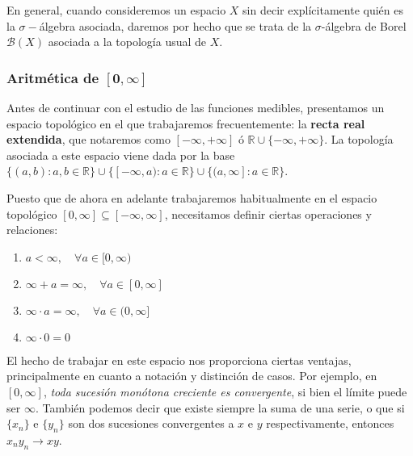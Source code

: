 \documentclass[11pt, a4paper]{article}
\newcommand{\bm}[1]{\boldsymbol{#1}}
\newcommand{\xn}{\{x_n\}}
\theoremstyle{theorem-style}
\theoremstyle{definition-style}
\theoremstyle{remark-style}
\theoremstyle{example-style}
\newenvironment{nlist}
{\begin{enumerate}
    \renewcommand\labelenumi{(\emph{\roman{enumi})}}}
  {\end{enumerate}}
\begin{document}
En general, cuando consideremos un espacio $X$ sin decir explícitamente quién es la $\sigma-$álgebra asociada, daremos por hecho que se trata de la $\sigma$-álgebra de Borel $\mathcal B(X)$ asociada a la topología usual de $X$.


\subsubsection*{Aritmética de $\bm{[0,\infty]}$}

Antes de continuar con el estudio de las funciones medibles, presentamos un espacio topológico en el que trabajaremos frecuentemente: la \textbf{recta real extendida}, que notaremos como $[-\infty,+\infty]$ ó $\mathbb{R} \cup \{-\infty, +\infty\}$. La topología asociada a este espacio viene dada por la base $\{(a,b): a,b \in \mathbb{R}\} \cup \{[-\infty, a): a \in \mathbb{R}\} \cup \{(a,\infty]: a \in \mathbb{R}\}$.

Puesto que de ahora en adelante trabajaremos habitualmente en el espacio topológico $[0,\infty] \subseteq [-\infty,\infty]$, necesitamos definir ciertas operaciones y relaciones:
\begin{nlist}
\item $a < \infty, \quad \forall a \in [0,\infty)$
\item $\infty + a = \infty, \quad \forall a \in [0,\infty]$
\item $\infty \cdot a = \infty, \quad \forall a \in (0,\infty]$
\item $\infty \cdot 0 = 0$
\end{nlist}

El hecho de trabajar en este espacio nos proporciona ciertas ventajas, principalmente en cuanto a notación y distinción de casos. Por ejemplo, en $[0, \infty]$, \textit{toda sucesión monótona creciente es convergente}, si bien el límite puede ser $\infty$. También podemos decir que existe siempre la suma de una serie, o que si $\xn$ e $\{y_n\}$ son dos sucesiones convergentes a $x$ e $y$ respectivamente, entonces $x_ny_n \to xy$.


\end{document}
